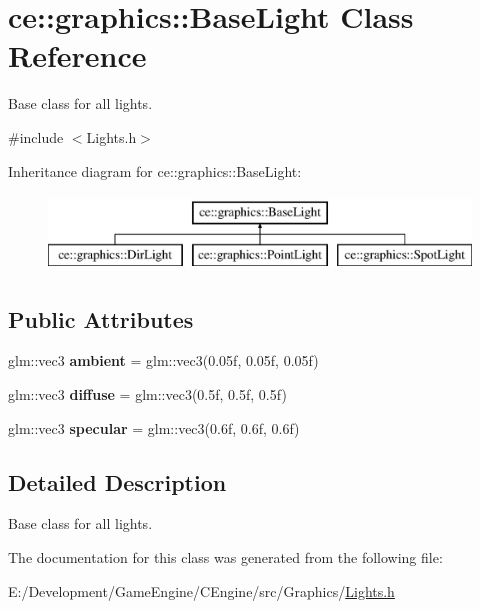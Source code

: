 \hypertarget{classce_1_1graphics_1_1_base_light}{}\section{ce\+:\+:graphics\+:\+:Base\+Light Class Reference}
\label{classce_1_1graphics_1_1_base_light}


Base class for all lights.  




{\ttfamily \#include $<$Lights.\+h$>$}

Inheritance diagram for ce\+:\+:graphics\+:\+:Base\+Light\+:\begin{figure}[H]
\begin{center}
\leavevmode
\includegraphics[height=2.000000cm]{classce_1_1graphics_1_1_base_light}
\end{center}
\end{figure}
\subsection*{Public Attributes}
\begin{DoxyCompactItemize}
\item 
\mbox{\label{classce_1_1graphics_1_1_base_light_ab7d381028fc562de3e35aaba218e0ef8}} 
glm\+::vec3 {\bfseries ambient} = glm\+::vec3(0.\+05f, 0.\+05f, 0.\+05f)
\item 
\mbox{\label{classce_1_1graphics_1_1_base_light_a4435de10ee05a5c96bce761b1148d96e}} 
glm\+::vec3 {\bfseries diffuse} = glm\+::vec3(0.\+5f, 0.\+5f, 0.\+5f)
\item 
\mbox{\label{classce_1_1graphics_1_1_base_light_a8aca51622639df6f87b276a9e791f0e5}} 
glm\+::vec3 {\bfseries specular} = glm\+::vec3(0.\+6f, 0.\+6f, 0.\+6f)
\end{DoxyCompactItemize}


\subsection{Detailed Description}
Base class for all lights. 

The documentation for this class was generated from the following file\+:\begin{DoxyCompactItemize}
\item 
E\+:/\+Development/\+Game\+Engine/\+C\+Engine/src/\+Graphics/\hyperlink{_lights_8h}{Lights.\+h}\end{DoxyCompactItemize}
